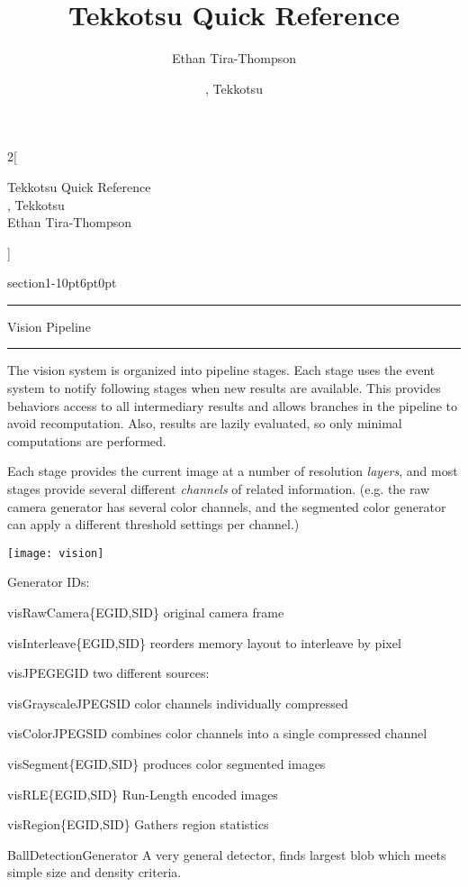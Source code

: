 \documentclass[10pt]{article}
\title{Tekkotsu Quick Reference}
\date{\model, Tekkotsu \release}
\author{Ethan Tira-Thompson}
\makeatletter
\renewcommand{\labelitemi}{{\tiny $\blacklozenge$}}
\newlength{\QRsubindent}
\newenvironment{keylist}
	{\begin{list}{}{
		\flushleft
		\providecommand{\keyliststyle}{\tt}
		\renewcommand{\makelabel}[1]{\labelitemi\ {\keyliststyle ##1} - }
		\setlength{\QRsubindent}{6pt}
		\setlength{\itemsep}{2pt}
		\setlength{\parsep}{0pt}
		\setlength{\labelsep}{0pt}
		\setlength{\leftmargin}{12pt}
		\setlength{\labelwidth}{9pt}
		\setlength{\parindent}{0pt}
		\setlength{\listparindent}{0pt}}}
	{\end{list}}
\newenvironment{keyenum}
	{\begin{list}{}{
		\flushleft
		\providecommand{\keyliststyle}{\tt}
		\renewcommand{\makelabel}[1]{\labelitemi\ {\keyliststyle ##1} - }
		\setlength{\QRsubindent}{6pt}
		\setlength{\itemsep}{2pt}
		\setlength{\parsep}{0pt}
		\setlength{\labelsep}{0pt}
		\setlength{\leftmargin}{12pt}
		\setlength{\labelwidth}{9pt}
		\setlength{\parindent}{0pt}
		\setlength{\listparindent}{0pt}}}
	{\end{list}}
\renewcommand{\section}[1]{\@startsection%
	{section}{1}{-10pt}{6pt}{0pt}{\Large\bf\hspace{6pt}\rule[.2\lineheight]{24pt}{2pt}\hspace{-30pt}}%
	{\hspace{28pt}#1}%
}
\renewcommand{\subsection}[1]{\@startsection{subsection}{2}{0pt}{3pt}{0.01pt}{\large\bf}{#1}}
\newenvironment{QRsection}[1]
	{\section{#1}\hspace{6pt}\rule[.2\lineheight]{72pt}{2pt}}
	{}
\newenvironment{QRsubsection}[1]
	{\subsection{#1}}
	{}
\renewcommand{\maketitle}{\begin{center}%
\large{\huge Tekkotsu Quick Reference} \vspace{6pt} \\%
\model, Tekkotsu \release \vspace{6pt} \\%
Ethan Tira-Thompson \vspace{12pt}%
\end{center}
}
\makeatother
\begin{document}
         


\raggedcolumns
\begin{multicols}{2}[\maketitle]
\raggedcolumns


\begin{QRsection}{Vision Pipeline}

The vision system is organized into pipeline stages.  Each stage uses the event system to notify following stages when new results are available.  This provides behaviors access to all intermediary results and allows branches in the pipeline to avoid recomputation.  Also, results are lazily evaluated, so only minimal computations are performed.

Each stage provides the current image at a number of resolution {\em layers}, and most stages provide several different {\em channels} of related information.  (e.g. the raw camera generator has several color channels, and the segmented color generator can apply a different threshold settings per channel.)

\begin{QRsubsection}{Included Stages}
\begin{center}
\texttt{[image: vision]}
\end{center}

Generator IDs:
\begin{keyenum}\small
\item[visRawCamera\{EGID,SID\}] original camera frame
\item[visInterleave\{EGID,SID\}] reorders memory layout to interleave by pixel
\item[visJPEGEGID] two different sources:
\begin{keylist}
\item[visGrayscaleJPEGSID] color channels individually compressed
\item[visColorJPEGSID] combines color channels into a single compressed channel 
\end{keylist}
\item[visSegment\{EGID,SID\}] produces color segmented images
\item[visRLE\{EGID,SID\}] Run-Length encoded images
\item[visRegion\{EGID,SID\}] Gathers region statistics
\item[BallDetectionGenerator] A very general detector, finds largest blob which meets simple size and density criteria.
\end{keyenum}
\end{QRsubsection}


\end{QRsection}
\end{multicols}
\end{document}
